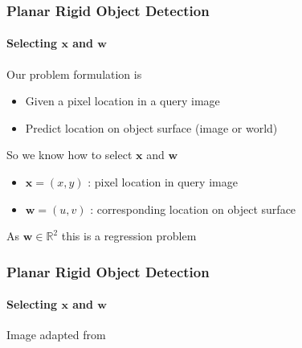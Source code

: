 \documentclass[xetex,professionalfont]{beamer}
\newcommand{\RR}{\mathbb{R}}
\renewcommand{\vec}[1]{\ensuremath{\mathbf{#1}}}
\newcommand{\vw}{\vec{w}}
\newcommand{\vx}{\vec{x}}
\renewcommand\emph[1]{\textcolor{tuwcvl_inf_red}{#1}}
\begin{document}
\begin{frame}
\frametitle{Planar Rigid Object Detection}
\framesubtitle{Selecting $\vx$ and $\vw$}

Our problem formulation is  %
\begin{itemize}
	\item Given a pixel location in a query image
	\item Predict location on object surface (image or world)  %
\end{itemize}

\bigskip
So we know how to select $\vx$ and $\vw$
\begin{itemize}
	\item $\vx=(x,y)$ : pixel location in query image
	\item $\vw=(u,v)$ : corresponding location on object surface %
\end{itemize}

\bigskip
As $\vw\in\RR^2$ this is a \emph{regression problem}

\end{frame}


\begin{frame}
\frametitle{Planar Rigid Object Detection}
\framesubtitle{Selecting $\vx$ and $\vw$}

\begin{center}
    {\centering Image adapted from \cite{prince12}}
\end{center}

\end{frame}
\end{document}
